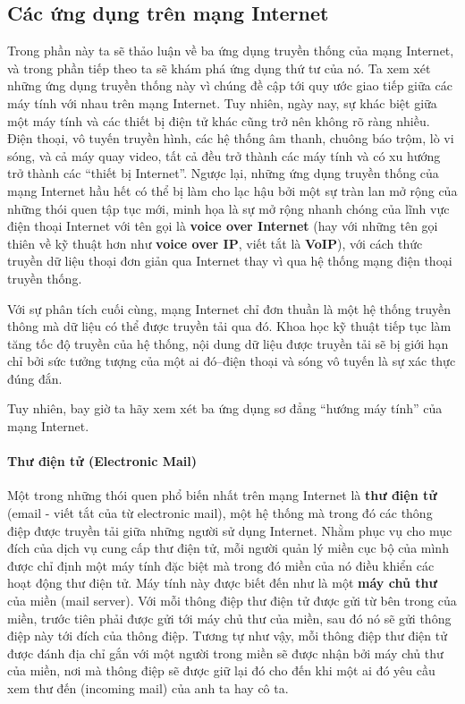 \subsection*{Các ứng dụng trên mạng Internet}
Trong phần này ta sẽ thảo luận về ba ứng dụng truyền thống của mạng Internet, và
trong phần tiếp theo ta sẽ khám phá ứng dụng thứ tư của nó. Ta xem xét những
ứng dụng truyền thống này vì chúng đề cập tới quy ước giao tiếp giữa các máy tính với nhau
trên mạng Internet. Tuy nhiên, ngày nay, sự khác biệt giữa một máy tính và các thiết bị
điện tử khác cũng trở nên không rõ ràng nhiều. Điện thoại, vô tuyến truyền hình, các hệ
thống âm thanh, chuông báo trộm, lò vi sóng, và cả máy quay video, tất cả đều trở thành
các máy tính và có xu hướng trở thành các ``thiết bị Internet''. Ngược lại, những ứng dụng
truyền thống của mạng Internet hầu hết có thể bị làm cho lạc hậu bởi một sự tràn lan mở
rộng của những thói quen tập tục mới, minh họa là sự mở rộng nhanh chóng của lĩnh vực điện
thoại Internet với tên gọi là \textbf{voice over Internet} (hay với những tên gọi thiên về
kỹ thuật hơn như \textbf{voice over IP}, viết tắt là \textbf{VoIP}), với cách thức truyền
dữ liệu thoại đơn giản qua Internet thay vì qua hệ thống mạng điện thoại truyền thống.

Với sự phân tích cuối cùng, mạng Internet chỉ đơn thuần là một hệ thống truyền thông mà dữ
liệu có thể được truyền tải qua đó. Khoa học kỹ thuật tiếp tục làm tăng tốc độ truyền của
hệ thống, nội dung dữ liệu được truyền tải sẽ bị giới hạn chỉ bởi sức tưởng tượng của một
ai đó--điện thoại và sóng vô tuyến là sự xác thực đúng đắn.

Tuy nhiên, bay giờ ta hãy xem xét ba ứng dụng sơ đẳng ``hướng máy tính'' của mạng
Internet.

\paragraph{Thư điện tử (Electronic Mail)} Một trong những thói quen phổ biến nhất trên
mạng Internet là \textbf{thư điện tử} (email - viết tắt của từ electronic mail), một hệ
thống mà trong đó các thông điệp được truyền tải giữa những người sử dụng Internet. Nhằm
phục vụ cho mục đích của dịch vụ cung cấp thư điện tử, mỗi người quản lý miền cục bộ của
mình được chỉ định một máy tính đặc biệt mà trong đó miền của nó điều khiển các hoạt động
thư điện tử. Máy tính này được biết đến như là một \textbf{máy chủ thư} của miền (mail
server). Với mỗi thông điệp thư điện tử được gửi từ bên trong của miền, trước tiên phải
được gửi tới máy chủ thư của miền, sau đó nó sẽ gửi thông điệp này tới đích của thông
điệp. Tương tự như vậy, mỗi thông điệp thư điện tử được đánh địa chỉ gắn với một người
trong miền sẽ được nhận bởi máy chủ thư của miền, nơi mà thông điệp sẽ được giữ lại đó cho
đến khi một ai đó yêu cầu xem thư đến (incoming mail) của anh ta hay cô ta.

